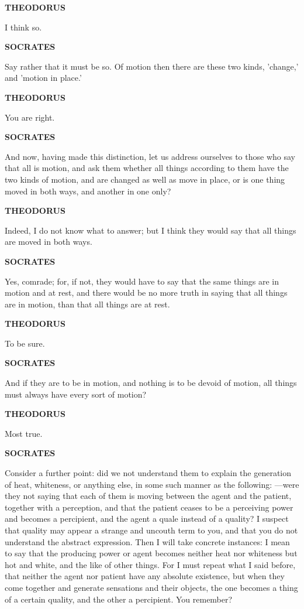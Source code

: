 \documentclass[11pt,letter]{article}
\begin{document}
\par \textbf{THEODORUS}
\par   I think so.

\par \textbf{SOCRATES}
\par   Say rather that it must be so. Of motion then there are these two kinds, 'change,' and 'motion in place.'

\par \textbf{THEODORUS}
\par   You are right.

\par \textbf{SOCRATES}
\par   And now, having made this distinction, let us address ourselves to those who say that all is motion, and ask them whether all things according to them have the two kinds of motion, and are changed as well as move in place, or is one thing moved in both ways, and another in one only?

\par \textbf{THEODORUS}
\par   Indeed, I do not know what to answer; but I think they would say that all things are moved in both ways.

\par \textbf{SOCRATES}
\par   Yes, comrade; for, if not, they would have to say that the same things are in motion and at rest, and there would be no more truth in saying that all things are in motion, than that all things are at rest.

\par \textbf{THEODORUS}
\par   To be sure.

\par \textbf{SOCRATES}
\par   And if they are to be in motion, and nothing is to be devoid of motion, all things must always have every sort of motion?

\par \textbf{THEODORUS}
\par   Most true.

\par \textbf{SOCRATES}
\par   Consider a further point:  did we not understand them to explain the generation of heat, whiteness, or anything else, in some such manner as the following: —were they not saying that each of them is moving between the agent and the patient, together with a perception, and that the patient ceases to be a perceiving power and becomes a percipient, and the agent a quale instead of a quality? I suspect that quality may appear a strange and uncouth term to you, and that you do not understand the abstract expression. Then I will take concrete instances:  I mean to say that the producing power or agent becomes neither heat nor whiteness but hot and white, and the like of other things. For I must repeat what I said before, that neither the agent nor patient have any absolute existence, but when they come together and generate sensations and their objects, the one becomes a thing of a certain quality, and the other a percipient. You remember?
\end{document}
